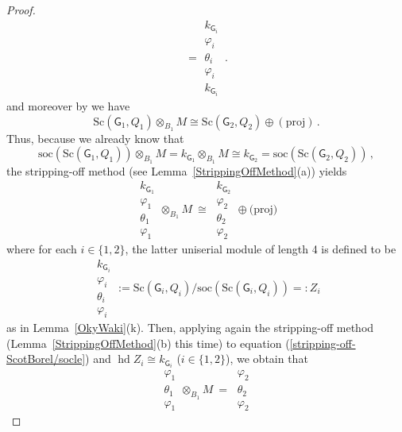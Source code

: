 \documentclass[12pt,a4paper]{amsart}
\theoremstyle{plain}\newtheorem{Theorem}{Theorem}[section]
\theoremstyle{plain}\newtheorem{Conjecture}[Theorem]{Conjecture}
\theoremstyle{plain}\newtheorem{Corollary}[Theorem]{Corollary}
\theoremstyle{plain}\newtheorem{Lemma}[Theorem]{Lemma}
\theoremstyle{plain}\newtheorem{Proposition}[Theorem]{Proposition}
\theoremstyle{definition}\newtheorem{Definition}[Theorem]{Definition}
\theoremstyle{definition}\newtheorem{Example}[Theorem]{Example}
\theoremstyle{definition}\newtheorem{Examples}[Theorem]{Examples}
\theoremstyle{definition}\newtheorem{Remark}[Theorem]{Remark}
\theoremstyle{definition}\newtheorem{Question}[Theorem]{Question}
\theoremstyle{definition}\newtheorem{Notation}[Theorem]{Notation}
\theoremstyle{definition}\newtheorem{Hypothesis}[Theorem]{Hypothesis}
\theoremstyle{definition}\newtheorem{Assumption}[Theorem]{Assumption}
\theoremstyle{definition}\newtheorem{Strategy}[Theorem]{Strategy}
\theoremstyle{definition}\newtheorem{Contents}[Theorem]{Contents}
\theoremstyle{definition}\newtheorem{Computations}[Theorem]{Computations}
\theoremstyle{definition}\newtheorem{Equivalences}[Theorem]{Equivalences}
\theoremstyle{definition}\newtheorem{Notation/Definition}[Theorem]{Notation/Definition}
\theoremstyle{definition}\newtheorem{noth}[Theorem]{}
\theoremstyle{plain}\newtheorem{Step}[Theorem]{Step}
\def\soc{\mathrm{soc}} \def\tenOS{\otimes_{\mathcal{O}S}} \def\Tr{\mathrm{Tr}}
\newcommand{\hd}{\operatorname{hd}}
\newcommand{\Sc}{{\text{Sc}}}
\begin{document}
\begin{proof}
\begin{equation}
=\boxed{\begin{matrix}k_{{\mathsf{G}}_i}\\ \varphi_i\\ \theta_i\\ \varphi_i\\k_{{\mathsf{G}}_i}\end{matrix}}\,.
\end{equation} and moreover  by \cite[Lemma~3.4(c)]{KL20a} we have 
$$\Sc({\mathsf{G}}_1, Q_1)\otimes_{B_{1}}M\cong 
\Sc({\mathsf{G}}_2, Q_2)\oplus (\text{proj})\,.$$
Thus, because we already know that 
$$\soc(\Sc({\mathsf{G}}_1, Q_1))\otimes_{B_1}M=k_{\mathsf{G}_1}\otimes_{B_1}M
\cong k_{\mathsf{G}_2}=\soc(\Sc({\mathsf{G}}_2, Q_2))\,,$$
the stripping-off method  (see Lemma~\ref{StrippingOffMethod}(a))
yields 
\begin{equation}\label{stripping-off-ScotBorel/socle} 
\boxed{\begin{matrix}k_{{\mathsf{G}}_1}\\ \varphi_1\\ \theta_1\\ \varphi_1\end{matrix}}
\otimes_{B_1}M \ \cong \ 
\boxed{\begin{matrix}k_{{\mathsf{G}}_2}\\ \varphi_2\\ \theta_2\\ \varphi_2\end{matrix}}
\oplus\text{(proj)}
\end{equation}
where for each $i\in\{1,2\}$, the latter uniserial module of length 4 is defined to be 
$$\boxed{\begin{matrix}k_{{\mathsf{G}}_i}\\ \varphi_i\\ \theta_i\\ \varphi_i\end{matrix}}
:=\Sc({\mathsf{G}}_i, Q_i)/\soc(\Sc({\mathsf{G}}_i, Q_i))=:Z_{i}$$ 
as in Lemma~\ref{OkyWaki}(k). Then, applying again the stripping-off method 
(Lemma~\ref{StrippingOffMethod}(b) this time) to equation (\ref{stripping-off-ScotBorel/socle}) and $\hd{Z}_{i}\cong k_{\mathsf{G}_{i}}$ ($i\in\{1,2\}$), we obtain that
\begin{equation}\label{Y_i}
\boxed{\begin{matrix}\varphi_1\\ \theta_1\\ \varphi_1\end{matrix}}
\otimes_{B_1} M
\ = \ 
\boxed{\begin{matrix}\varphi_2\\ \theta_2\\ \varphi_2\end{matrix}}

\end{equation}
\end{proof}
\end{document}
